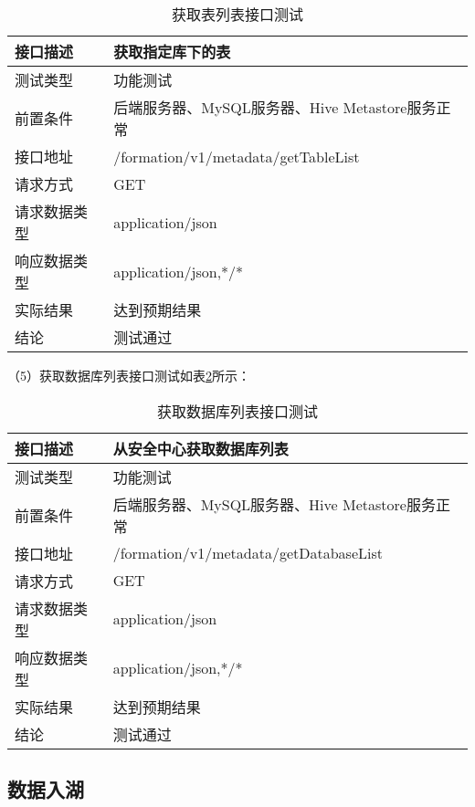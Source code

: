 \begin{table}[H]
  \centering
  \caption{获取表列表接口测试}
  \label{tab:exampletable7}
  \begin{tabular}{ll}
    \toprule
    接口描述         & 获取指定库下的表         \\
    \midrule
    测试类型         & 功能测试         \\
    前置条件         & 后端服务器、MySQL服务器、Hive Metastore服务正常         \\
    接口地址       & /formation/v1/metadata/getTableList        \\
    请求方式         & GET      \\
    请求数据类型         & application/json     \\
    响应数据类型         & application/json,*/*           \\
    实际结果         & 达到预期结果           \\
    结论            & 测试通过           \\
    \bottomrule
  \end{tabular}
\end{table}

（5）获取数据库列表接口测试如表\ref{tab:exampletable8}所示：

\begin{table}[H]
  \centering
  \caption{获取数据库列表接口测试}
  \label{tab:exampletable8}
  \begin{tabular}{ll}
    \toprule
    接口描述         & 从安全中心获取数据库列表         \\
    \midrule
    测试类型         & 功能测试         \\
    前置条件         & 后端服务器、MySQL服务器、Hive Metastore服务正常         \\
    接口地址       & /formation/v1/metadata/getDatabaseList        \\
    请求方式         & GET      \\
    请求数据类型         & application/json     \\
    响应数据类型         & application/json,*/*           \\
    实际结果         & 达到预期结果           \\
    结论            & 测试通过           \\
    \bottomrule
  \end{tabular}
\end{table}

\subsection{数据入湖}

